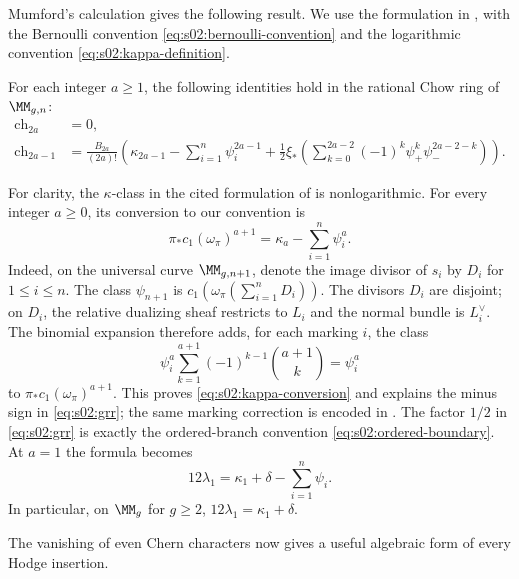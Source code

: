 Mumford's calculation \cite[\S 5, (5.2)--(5.3)]{Mum83} gives the
following result.  We use the formulation in
\cite[\S 1.1, Theorem (Mumford)]{FP00}, with the Bernoulli convention
\eqref{eq:s02:bernoulli-convention} and the logarithmic convention
\eqref{eq:s02:kappa-definition}.

\begin{thm}
\label{thm:s02:grr}
For each integer $a\geq1$, the following identities hold in the
rational Chow ring of $\MM_{g,n}$:
\begin{equation}
\label{eq:s02:grr}
\begin{split}
\mathrm{ch}_{2a}&=0,\\
\mathrm{ch}_{2a-1}
&=\frac{B_{2a}}{(2a)!}
\left(
\kappa_{2a-1}-\sum_{i=1}^n\psi_i^{2a-1}
+\frac12\xi_*\!\left(
\sum_{k=0}^{2a-2}(-1)^k\psi_+^k\psi_-^{2a-2-k}
\right)\right).
\end{split}
\end{equation}
\end{thm}

For clarity, the $\kappa$-class in the cited formulation of
\cite{FP00} is nonlogarithmic.  For every integer $a\geq0$, its
conversion to our convention is
\begin{equation}
\label{eq:s02:kappa-conversion}
\pi_*c_1(\omega_\pi)^{a+1}
=\kappa_a-\sum_{i=1}^n\psi_i^a.
\end{equation}
Indeed, on the universal curve $\MM_{g,n+1}$, denote the image
divisor of $s_i$ by $D_i$ for $1\leq i\leq n$.
The class $\psi_{n+1}$ is
$c_1(\omega_\pi(\sum_{i=1}^nD_i))$.  The divisors $D_i$ are
disjoint; on $D_i$, the relative dualizing sheaf restricts to $L_i$
and the normal bundle is $L_i^\vee$.  The binomial expansion therefore
adds, for each marking $i$, the class
\[
\psi_i^a\sum_{k=1}^{a+1}(-1)^{k-1}\binom{a+1}{k}
=\psi_i^a
\]
to $\pi_*c_1(\omega_\pi)^{a+1}$.  This proves
\eqref{eq:s02:kappa-conversion} and explains the minus sign in
\eqref{eq:s02:grr}; the same marking correction is encoded in
\cite[\S 1.3, (16)]{FP00}.  The factor $1/2$ in
\eqref{eq:s02:grr} is exactly the ordered-branch convention
\eqref{eq:s02:ordered-boundary}.  At $a=1$ the formula becomes
\begin{equation}
\label{eq:s02:lambda-one-grr}
12\lambda_1=\kappa_1+\delta-\sum_{i=1}^n\psi_i.
\end{equation}
In particular, on $\MM_g$ for $g\geq2$,
$12\lambda_1=\kappa_1+\delta$.

The vanishing of even Chern characters now gives a useful algebraic
form of every Hodge insertion.

